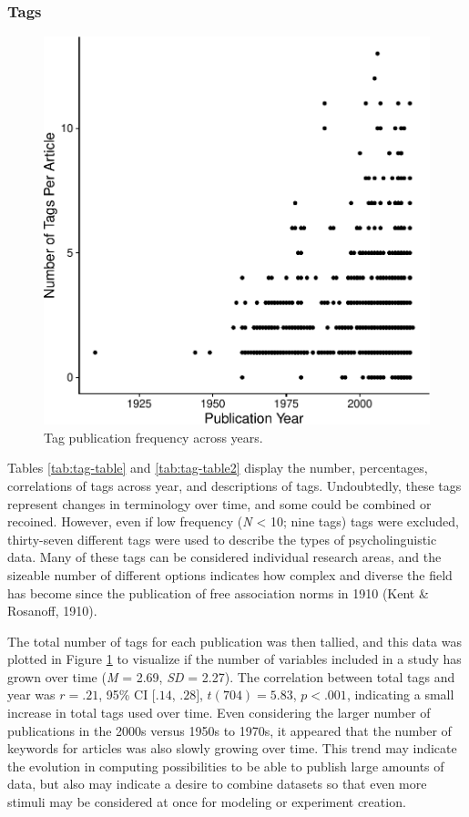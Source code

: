 \documentclass[english,man]{apa6}
\theoremstyle{definition}
\theoremstyle{definition}
\theoremstyle{definition}
\theoremstyle{remark}
\begin{document}
\subsubsection{Tags}\label{tags}

\begin{figure}
\centering
\includegraphics{LAB_files/figure-latex/tag-fig-1.pdf}
\caption{\label{fig:tag-fig}Tag publication frequency across years.}
\end{figure}

Tables \ref{tab:tag-table} and \ref{tab:tag-table2} display the number,
percentages, correlations of tags across year, and descriptions of tags.
Undoubtedly, these tags represent changes in terminology over time, and
some could be combined or recoined. However, even if low frequency
(\emph{N} \textless{} 10; nine tags) tags were excluded, thirty-seven
different tags were used to describe the types of psycholinguistic data.
Many of these tags can be considered individual research areas, and the
sizeable number of different options indicates how complex and diverse
the field has become since the publication of free association norms in
1910 (Kent \& Rosanoff, 1910).

The total number of tags for each publication was then tallied, and this
data was plotted in Figure \ref{fig:tag-fig} to visualize if the number
of variables included in a study has grown over time (\emph{M} = 2.69,
\emph{SD} = 2.27). The correlation between total tags and year was
\(r = .21\), 95\% CI \([.14\), \(.28]\), \(t(704) = 5.83\),
\(p < .001\), indicating a small increase in total tags used over time.
Even considering the larger number of publications in the 2000s versus
1950s to 1970s, it appeared that the number of keywords for articles was
also slowly growing over time. This trend may indicate the evolution in
computing possibilities to be able to publish large amounts of data, but
also may indicate a desire to combine datasets so that even more stimuli
may be considered at once for modeling or experiment creation.
\end{document}
